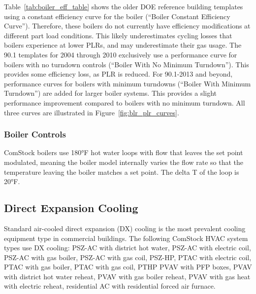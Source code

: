 Table~\ref{tab:boiler_eff_table} shows the older DOE reference building templates using a constant efficiency curve for the boiler (``Boiler Constant Efficiency Curve''). Therefore, these boilers do not currently have efficiency modifications at different part load conditions. This likely underestimates cycling losses that boilers experience at lower PLRs, and may underestimate their gas usage. The 90.1 templates for 2004 through 2010 exclusively use a performance curve for boilers with no turndown controls (``Boiler With No Minimum Turndown''). This provides some efficiency loss, as PLR is reduced. For 90.1-2013 and beyond, performance curves for boilers with minimum turndowns (``Boiler With Minimum Turndown'') are added for larger boiler systems. This provides a slight performance improvement compared to boilers with no minimum turndown. All three curves are illustrated in Figure~\ref{fig:blr_plr_curves}.




\subsubsection{Boiler Controls}

ComStock boilers use 180°F hot water loops with flow that leaves the set point modulated, meaning the boiler model internally varies the flow rate so that the temperature leaving the boiler matches a set point. The delta T of the loop is 20°F. %



\subsection{Direct Expansion Cooling}

Standard air-cooled direct expansion (DX) cooling is the most prevalent cooling equipment type in commercial buildings. The following ComStock HVAC system types use DX cooling: PSZ-AC with district hot water, PSZ-AC with electric coil, PSZ-AC with gas boiler, PSZ-AC with gas coil, PSZ-HP, PTAC with electric coil, PTAC with gas boiler, PTAC with gas coil, PTHP
PVAV with PFP boxes, PVAV with district hot water reheat, PVAV with gas boiler reheat, PVAV with gas heat with electric reheat, residential AC with residential forced air furnace.

